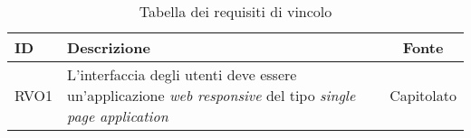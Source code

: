 \begin{table}[H]
	\renewcommand{\arraystretch}{1.5}
	\centering
	\begin{tabularx}{\textwidth}{l|X|c}
		\textbf{ID} & \textbf{Descrizione}                                                                                                     & \textbf{Fonte} \\
		\hline
		RVO1        & L'interfaccia degli utenti deve essere un'applicazione \textit{web responsive} del tipo \textit{single page application} & Capitolato     \\
		\hline
	\end{tabularx}
	\caption{Tabella dei requisiti di vincolo}
\end{table}
